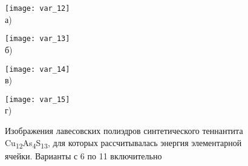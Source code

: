 \begin{figure}[p!]
  \begin{minipage}[ht]{0.45\linewidth}\centering
    \texttt{[image: var\_12]} \\ а)
  \end{minipage}
\hfill
 \begin{minipage}[ht]{0.45\linewidth}\centering
    \texttt{[image: var\_13]} \\ б)
  \end{minipage}
\vfill
  \begin{minipage}[ht]{0.45\linewidth}\centering
    \texttt{[image: var\_14]} \\ в)
  \end{minipage}
	\hfill
 \begin{minipage}[ht]{0.45\linewidth}\centering
    \texttt{[image: var\_15]} \\ г)
  \end{minipage}
\vfill

  \begin{minipage}[ht]{0.45\linewidth}\centering

  \end{minipage}
						\hfill
 \begin{minipage}[ht]{0.45\linewidth}\centering

  \end{minipage}
      \caption[Изображения лавесовских полиэдров синтетического теннантита Cu\textsubscript{12}As\textsubscript{4}S\textsubscript{13}, для которых рассчитывалась энергия элементарной ячейки. Варианты с 12 по 15 включительно]{Изображения лавесовских полиэдров синтетического теннантита Cu\textsubscript{12}As\textsubscript{4}S\textsubscript{13}, для которых рассчитывалась энергия элементарной ячейки. Варианты с 6 по 11 включительно}
    \label{img:laves3}
\end{figure}


